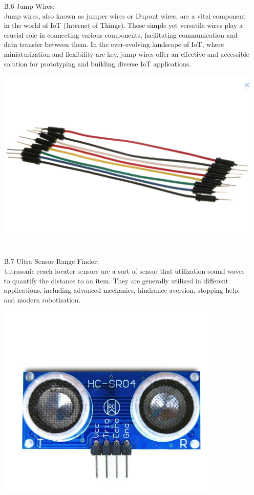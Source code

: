 \documentclass[conference, onecolumn]{IEEEtran}
\begin{document}
B.6 Jump Wires: \\
Jump wires, also known as jumper wires or Dupont wires, are a vital component in the world of IoT (Internet of Things). These simple yet versatile wires play a crucial role in connecting various components, facilitating communication and data transfer between them. In the ever-evolving landscape of IoT, where miniaturization and flexibility are key, jump wires offer an effective and accessible solution for prototyping and building diverse IoT applications.\\
\centerline{\includegraphics[width=3.8 in]{jump}}\\

B.7 Ultra Sensor Range Finder:\\
Ultrasonic reach locater sensors are a sort of sensor that utilization sound waves to quantify the distance to an item. They are generally utilized in different applications, including advanced mechanics, hindrance aversion, stopping help, and modern robotization.\\
\centerline{\includegraphics[width=3.8 in]{sensor}}\\
\end{document}
